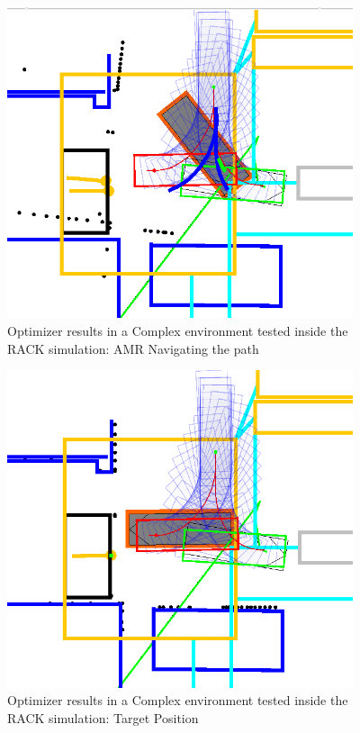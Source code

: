 \begin{figure}[H]
    \begin{center}
        \includegraphics[width=4in]{images/Chap3/2.png} %
        \caption{Optimizer results in a Complex environment tested inside the RACK simulation: AMR Navigating the path}
        \label{OptResult7}
        \end{center}    
\end{figure}

\begin{figure}[H]
    \begin{center}
        \includegraphics[width=4in]{images/Chap3/3.png} %
        \caption{Optimizer results in a Complex environment tested inside the RACK simulation: Target Position}
        \label{OptResult8}
        \end{center}    
\end{figure}

